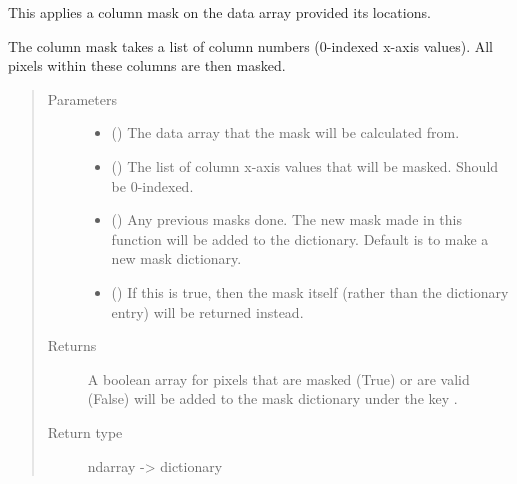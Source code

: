 \documentclass[letterpaper,10pt,english]{sphinxmanual}
\begin{document}
\begin{fulllineitems}
\label{\detokenize{python_docstrings/IfA_Smeargle.echo.masks.masks_echo300:IfA_Smeargle.echo.masks.masks_echo300.echo382_column_mask}}
This applies a column mask on the data array provided its locations.

The column mask takes a list of column numbers (0-indexed x-axis
values). All pixels within these columns are then masked.
\begin{quote}\begin{description}
\item[{Parameters}] \leavevmode\begin{itemize}
\item {} 
 () \textendash{} The data array that the mask will be calculated from.

\item {} 
 () \textendash{} The list of column x-axis values that will be masked. Should be
0-indexed.

\item {} 
 (\sphinxstyleliteralemphasis{\sphinxupquote{ (}}\sphinxstyleliteralemphasis{\sphinxupquote{)}}) \textendash{} Any previous masks done. The new mask made in this function will be
added to the dictionary. Default is to make a new mask dictionary.

\item {} 
 (\sphinxstyleliteralemphasis{\sphinxupquote{ (}}\sphinxstyleliteralemphasis{\sphinxupquote{)}}) \textendash{} If this is true, then the mask itself (rather than the dictionary
entry) will be returned instead.

\end{itemize}

\item[{Returns}] \leavevmode
{} \textendash{} A boolean array for pixels that are masked (True) or are valid
(False) will be added to the mask dictionary under the
key .

\item[{Return type}] \leavevmode
ndarray -\textgreater{} dictionary

\end{description}\end{quote}

\end{fulllineitems}
\end{document}
